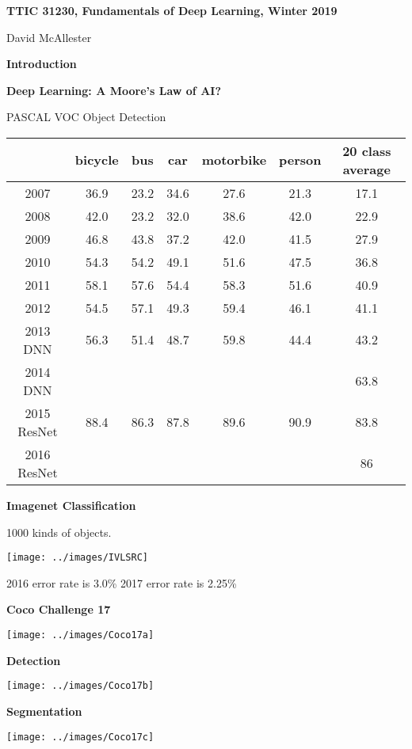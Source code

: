 \documentclass[landscape]{article}
\newcommand{\slide}[1]{\vfill
\eject
\centerline{\bf #1}
\vfill}
\begin{document}
{\huge
  \centerline{\bf TTIC 31230,  Fundamentals of Deep Learning, Winter 2019}
  \vfill
  \centerline{David McAllester}
  \vfill
  \centerline{\bf Introduction}


\slide{Deep Learning: A Moore's Law of AI?}

PASCAL VOC Object Detection

\vfill

\begin{center}
\begin{tabular}{|c|c|c|c|c|c|c|}
\hline
& bicycle & bus & car & motorbike & person & 20 class average \\
\hline
2007 & 36.9 & 23.2 & 34.6 &  27.6 &  21.3 &  17.1   \\
\hline 
2008 & 42.0 & 23.2 & 32.0 & 38.6 & 42.0 & 22.9   \\
\hline
2009 & 46.8 & 43.8 & 37.2 & 42.0 & 41.5 & 27.9 \\
\hline 
2010 & 54.3 & 54.2 & 49.1 & 51.6 & 47.5 & 36.8 \\
\hline
2011 & 58.1 & 57.6 & 54.4 & 58.3 & 51.6 & 40.9 \\
\hline
2012 & 54.5 & 57.1 & 49.3 & 59.4 & 46.1 & 41.1 \\
\hline
2013 DNN & 56.3 & 51.4 & 48.7 & 59.8 & 44.4 & 43.2 \\
\hline
2014 DNN & & & & & & 63.8 \\
\hline
2015 ResNet & 88.4 & 86.3 & 87.8 & 89.6 & 90.9 & 83.8 \\
\hline
2016 ResNet & &  & &  &  & 86 \\
\hline
\end{tabular}
\end{center}

\slide{Imagenet Classification}

1000 kinds of objects.

\vfill
\centerline{\texttt{[image: ../images/IVLSRC]}}

2016 error rate is 3.0\% \hspace{1.0in} 2017 error rate is 2.25\%

\slide{Coco Challenge 17}

\centerline{\texttt{[image: ../images/Coco17a]}}


\slide{Detection}

\centerline{\texttt{[image: ../images/Coco17b]}}


\slide{Segmentation}

\centerline{\texttt{[image: ../images/Coco17c]}}

}
\end{document}
